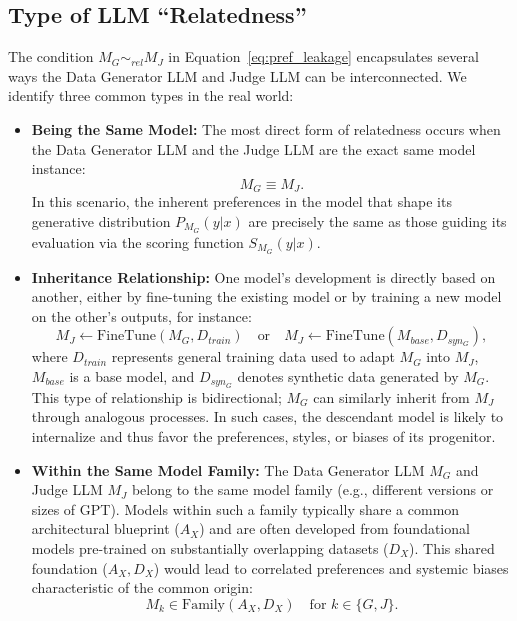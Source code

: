 \documentclass{article} %
\begin{document}
\subsection{Type of LLM ``Relatedness''}

The condition $M_G \sim_{rel} M_J$ in Equation~\ref{eq:pref_leakage} encapsulates several ways the Data Generator LLM and Judge LLM can be interconnected. We identify three common types in the real world:

\begin{itemize}[leftmargin=*,itemsep=1pt,topsep=2pt,parsep=1pt]
    \item \textbf{Being the Same Model:} The most direct form of relatedness occurs when the Data Generator LLM and the Judge LLM are the exact same model instance:
    \begin{equation}
        M_G \equiv M_J.
    \end{equation}
    In this scenario, the inherent preferences in the model that shape its generative distribution $P_{M_G}(y|x)$ are precisely the same as those guiding its evaluation via the scoring function $S_{M_G}(y|x)$.

    \item \textbf{Inheritance Relationship:} One model's development is directly based on another, either by fine-tuning the existing model or by training a new model on the other's outputs, for instance:
    \begin{equation}
         M_J \leftarrow \text{FineTune}(M_G, D_{train}) \quad \text{or} \quad M_J \leftarrow \text{FineTune}(M_{base}, D_{syn_G}),
    \end{equation}
    where $D_{train}$ represents general training data used to adapt $M_G$ into $M_J$, $M_{base}$ is a base model, and $D_{syn_G}$ denotes synthetic data generated by $M_G$. This type of relationship is bidirectional; $M_G$ can similarly inherit from $M_J$ through analogous processes. In such cases, the descendant model is likely to internalize and thus favor the preferences, styles, or biases of its progenitor.

    \item \textbf{Within the Same Model Family:} The Data Generator LLM $M_G$ and Judge LLM $M_J$ belong to the same model family (e.g., different versions or sizes of GPT). Models within such a family typically share a common architectural blueprint ($A_X$) and are often developed from foundational models pre-trained on substantially overlapping datasets ($D_X$).
    This shared foundation ($A_X, D_X$) would lead to correlated preferences and systemic biases characteristic of the common origin:
    \begin{equation}
        M_k \in \text{Family}(A_X, D_X) \quad \text{for } k \in \{G, J\}.
    \end{equation}
\end{itemize}
\end{document}
